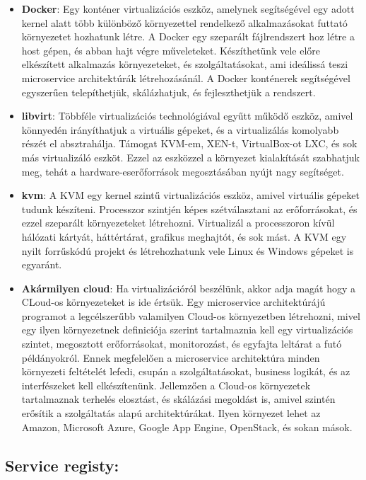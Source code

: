 \documentclass[11pt,magyar,a4paper,oneside,]{report}
\begin{document}
\begin{itemize}
\item
  \textbf{Docker}: Egy konténer virtualizációs eszköz, amelynek
  segítségével egy adott kernel alatt több különböző környezettel
  rendelkező alkalmazásokat futtató környezetet hozhatunk létre. A
  Docker egy szeparált fájlrendszert hoz létre a host gépen, és abban
  hajt végre műveleteket. Készíthetünk vele előre elkészített alkalmazás
  környezeteket, és szolgáltatásokat, ami ideálissá teszi microservice
  architektúrák létrehozásánál. A Docker konténerek segítségével
  egyszerűen telepíthetjük, skálázhatjuk, és fejleszthetjük a rendszert.
\item
  \textbf{libvirt}: Többféle virtualizációs technológiával egyűtt működő
  eszköz, amivel könnyedén irányíthatjuk a virtuális gépeket, és a
  virtualizálás komolyabb részét el absztrahálja. Támogat KVM-em, XEN-t,
  VirtualBox-ot LXC, és sok más virtualizáló eszköt. Ezzel az eszközzel
  a környezet kialakítását szabhatjuk meg, tehát a
  hardware-eserőforrások megosztásában nyújt nagy segítséget.
\item
  \textbf{kvm}: A KVM egy kernel szintű virtualizációs eszköz, amivel
  virtuális gépeket tudunk készíteni. Processzor szintjén képes
  szétválasztani az erőforrásokat, és ezzel szeparált környezeteket
  létrehozni. Virtualizál a processzoron kívül hálózati kártyát,
  háttértárat, grafikus meghajtót, és sok mást. A KVM egy nyilt
  forrűskódú projekt és létrehozhatunk vele Linux és Windows gépeket is
  egyaránt.
\item
  \textbf{Akármilyen cloud}: Ha virtualizációról beszélünk, akkor adja
  magát hogy a CLoud-os környezeteket is ide értsük. Egy microservice
  architektúrájú programot a legcélszerűbb valamilyen Cloud-os
  környezetben létrehozni, mivel egy ilyen környezetnek definiciója
  szerint tartalmaznia kell egy virtualizációs szintet, megosztott
  erőforrásokat, monitorozást, és egyfajta leltárat a futó példányokról.
  Ennek megfelelően a microservice architektúra minden környezeti
  feltételét lefedi, csupán a szolgáltatásokat, business logikát, és az
  interfészeket kell elkészítenünk. Jellemzően a Cloud-os környezetek
  tartalmaznak terhelés elosztást, és skálázási megoldást is, amivel
  szintén erősítik a szolgáltatás alapú architektúrákat. Ilyen környezet
  lehet az Amazon, Microsoft Azure, Google App Engine, OpenStack, és
  sokan mások.
\end{itemize}

\subsection{Service registy:}\label{service-registy}
\end{document}
